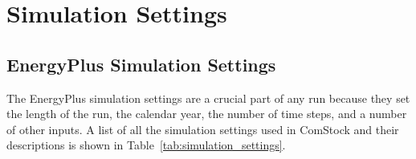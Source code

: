 \section{Simulation Settings}
\label{sec:Simulation_Settings}

\subsection{EnergyPlus Simulation Settings}

The EnergyPlus simulation settings are a crucial part of any run because they set the length of the run, the calendar year, the number of time steps, and a number of other inputs. A list of all the simulation settings used in ComStock and their descriptions is shown in Table~\ref{tab:simulation_settings}.



